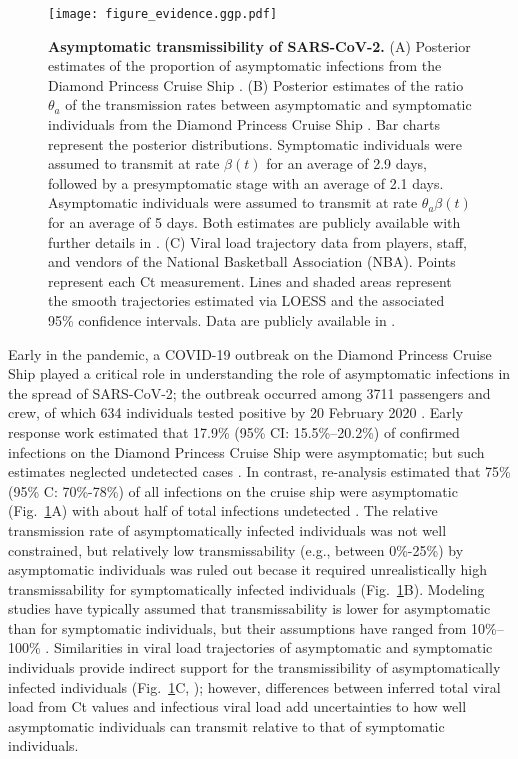 \documentclass[12pt]{article}
\newcommand{\fref}[1]{Fig.~\ref{fig:#1}}
\begin{document}
\begin{figure}[!ht]
\texttt{[image: figure\_evidence.ggp.pdf]}
\caption{
\textbf{Asymptomatic transmissibility of SARS-CoV-2.}
(A) Posterior estimates of the proportion of asymptomatic infections from the Diamond Princess Cruise Ship \cite{emery2020}.
(B) Posterior estimates of the ratio $\theta_a$ of the transmission rates between asymptomatic and symptomatic individuals from the Diamond Princess Cruise Ship \cite{emery2020}.
Bar charts represent the posterior distributions.
Symptomatic individuals were assumed to transmit at rate $\beta(t)$ for an average of 2.9 days, followed by a presymptomatic stage with an average of 2.1 days. 
Asymptomatic individuals were assumed to transmit at rate $\theta_a \beta(t)$ for an average of 5 days.
Both estimates are publicly available with further details in \cite{emery2020}.
(C) Viral load trajectory data from players, staff, and vendors of the National Basketball Association (NBA).
Points represent each Ct measurement.
Lines and shaded areas represent the smooth trajectories estimated via LOESS and the associated 95\% confidence intervals.
Data are publicly available in \cite{Kissler2020}.
}
\label{fig:evidence}
\end{figure}

Early in the pandemic, a COVID-19 outbreak on the Diamond Princess Cruise Ship played a critical role in understanding the role of asymptomatic infections in the spread of SARS-CoV-2;
the outbreak occurred among 3711 passengers and crew, of which 634 individuals tested positive by 20 February 2020 \citep{mizumoto2020estimating}.
Early response work estimated that 17.9\% (95\% CI: 15.5\%--20.2\%) of confirmed infections on the Diamond Princess Cruise Ship were asymptomatic; but such estimates neglected undetected cases \citep{mizumoto2020estimating}.
In contrast, re-analysis estimated that 75\% (95\% C: 70\%-78\%) of all infections on the cruise ship were asymptomatic (\fref{evidence}A) with about half of total infections undetected \cite{emery2020}.   
The relative transmission rate of asymptomatically infected individuals was not well constrained, but relatively low transmissability (e.g., between 0\%-25\%) by asymptomatic individuals was ruled out becase it required unrealistically high transmissability for symptomatically infected individuals (\fref{evidence}B).
Modeling studies have typically assumed that transmissability is lower for asymptomatic than for symptomatic individuals, but their assumptions have ranged from 10\%--100\% \citep{ferretti2020quantifying,lavezzo2020}.
Similarities in viral load trajectories of asymptomatic and symptomatic individuals provide indirect support for the transmissibility of asymptomatically infected individuals (\fref{evidence}C, \cite{Kissler2020}); 
however, differences between inferred total viral load from Ct values and infectious viral load add uncertainties to how well asymptomatic individuals can transmit relative to that of symptomatic individuals.
\end{document}
